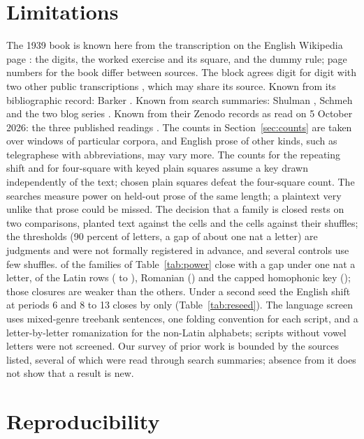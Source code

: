 \documentclass[11pt]{article}
\theoremstyle{definition}
\begin{document}
\section{Limitations}\label{sec:limits}

The 1939 book is known here from the transcription on the English Wikipedia page \cite{wikipedia2026}: the digits, the worked exercise and its square, and the dummy rule; page numbers for the book differ between sources. The block agrees digit for digit with two other public transcriptions \cite{ashley2026,snider2026}, which may share its source. Known from its bibliographic record: Barker \cite{barker1978}. Known from search summaries: Shulman \cite{shulman1952}, Schmeh \cite{schmeh2026mtc3} and the two blog series \cite{pleasedecipher2010,numberworld2015}. Known from their Zenodo records as read on 5 October 2026: the three published readings \cite{uygun2026,caillahua2026,leggett2025}. The counts in Section~\ref{sec:counts} are taken over windows of particular corpora, and English prose of other kinds, such as telegraphese with abbreviations, may vary more. The counts for the repeating shift and for four-square with keyed plain squares assume a key drawn independently of the text; chosen plain squares defeat the four-square count. The searches measure power on held-out prose of the same length; a plaintext very unlike that prose could be missed. The decision that a family is closed rests on two comparisons, planted text against the cells and the cells against their shuffles; the thresholds (90 percent of letters, a gap of about one nat a letter) are judgments and were not formally registered in advance, and several controls use few shuffles. \gapUnderOne{} of the \gapRows{} families of Table~\ref{tab:power} close with a gap under one nat a letter, \gapLatinUnder{} of the \gapLatinRows{} Latin rows (\gapLatinLow{} to \gapLatinUnderHigh{}), Romanian (\gapRomanianTab{}) and the capped homophonic key (\gapHomTab{}); those closures are weaker than the others. Under a second seed the English shift at periods 6 and 8 to 13 closes by only \rsEnglishLow{} (Table~\ref{tab:reseed}). The language screen uses mixed-genre treebank sentences, one folding convention for each script, and a letter-by-letter romanization for the non-Latin alphabets; scripts without vowel letters were not screened. Our survey of prior work is bounded by the sources listed, several of which were read through search summaries; absence from it does not show that a result is new.

\section{Reproducibility}\label{sec:repro}
\end{document}
